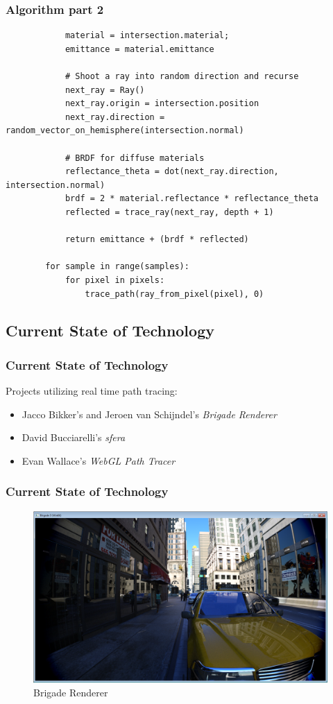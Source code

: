 \documentclass{beamer}
\begin{document}
\begin{frame}[fragile]
    \frametitle{Algorithm part 2}
    \scriptsize
    \begin{verbatim}
            material = intersection.material;
            emittance = material.emittance

            # Shoot a ray into random direction and recurse
            next_ray = Ray()
            next_ray.origin = intersection.position
            next_ray.direction = random_vector_on_hemisphere(intersection.normal)

            # BRDF for diffuse materials
            reflectance_theta = dot(next_ray.direction, intersection.normal)
            brdf = 2 * material.reflectance * reflectance_theta
            reflected = trace_ray(next_ray, depth + 1)

            return emittance + (brdf * reflected)

        for sample in range(samples):
            for pixel in pixels:
                trace_path(ray_from_pixel(pixel), 0)
    \end{verbatim}
\end{frame}

\subsection{Current State of Technology}
\begin{frame}
    \frametitle{Current State of Technology}
    Projects utilizing real time path tracing:
    \begin{itemize}
        \item Jacco Bikker's and Jeroen van Schijndel's \emph{Brigade Renderer}
        \item David Bucciarelli's \emph{sfera}
        \item Evan Wallace's \emph{WebGL Path Tracer}
    \end{itemize}
\end{frame}

\begin{frame}
    \frametitle{Current State of Technology}
    \begin{figure}[H]
        \includegraphics[scale=0.3]{brigade}
        \centering
        \caption{Brigade Renderer}
    \end{figure}
\end{frame}
\end{document}
